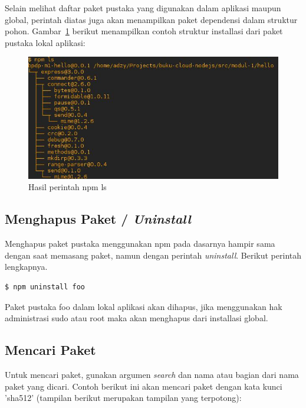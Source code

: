 Selain melihat daftar paket pustaka yang digunakan dalam aplikasi maupun global, perintah diatas juga akan menampilkan paket dependensi dalam struktur pohon. Gambar~\ref{fig:npmls} berikut menampilkan contoh struktur installasi dari paket pustaka lokal aplikasi:

  \begin{figure}
    \begin{center}
      \includegraphics[scale=0.5]{images/npmls.jpg}
    \end{center}
    \caption{Hasil perintah npm ls}
    \label{fig:npmls}
  \end{figure}

\subsection{Menghapus Paket / \textit{Uninstall}}

Menghapus paket pustaka menggunakan npm pada dasarnya hampir sama dengan saat memasang paket, namun dengan perintah \textit{uninstall}. Berikut perintah lengkapnya.

\lstset{language=bash,caption=Perintah menghapus paket di npm}
\begin{lstlisting}
$ npm uninstall foo
\end{lstlisting}

Paket pustaka foo dalam lokal aplikasi akan dihapus, jika menggunakan hak administrasi sudo atau root maka akan menghapus dari installasi global.

\subsection{Mencari Paket}

Untuk mencari paket, gunakan argumen \textit{search} dan nama atau bagian dari nama paket yang dicari. Contoh berikut ini akan mencari paket dengan kata kunci 'sha512' (tampilan berikut merupakan tampilan yang terpotong):

